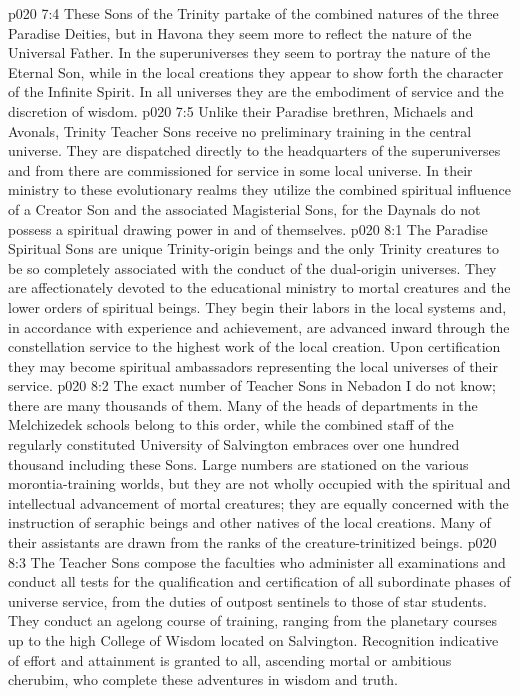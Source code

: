 \vs p020 7:4 These Sons of the Trinity partake of the combined natures of the three Paradise Deities, but in Havona they seem more to reflect the nature of the Universal Father. In the superuniverses they seem to portray the nature of the Eternal Son, while in the local creations they appear to show forth the character of the Infinite Spirit. In all universes they are the embodiment of service and the discretion of wisdom.
\vs p020 7:5 Unlike their Paradise brethren, Michaels and Avonals, Trinity Teacher Sons receive no preliminary training in the central universe. They are dispatched directly to the headquarters of the superuniverses and from there are commissioned for service in some local universe. In their ministry to these evolutionary realms they utilize the combined spiritual influence of a Creator Son and the associated Magisterial Sons, for the Daynals do not possess a spiritual drawing power in and of themselves.
\vs p020 8:1 The Paradise Spiritual Sons are unique Trinity\hyp{}origin beings and the only Trinity creatures to be so completely associated with the conduct of the dual\hyp{}origin universes. They are affectionately devoted to the educational ministry to mortal creatures and the lower orders of spiritual beings. They begin their labors in the local systems and, in accordance with experience and achievement, are advanced inward through the constellation service to the highest work of the local creation. Upon certification they may become spiritual ambassadors representing the local universes of their service.
\vs p020 8:2 The exact number of Teacher Sons in Nebadon I do not know; there are many thousands of them. Many of the heads of departments in the Melchizedek schools belong to this order, while the combined staff of the regularly constituted University of Salvington embraces over one hundred thousand including these Sons. Large numbers are stationed on the various morontia\hyp{}training worlds, but they are not wholly occupied with the spiritual and intellectual advancement of mortal creatures; they are equally concerned with the instruction of seraphic beings and other natives of the local creations. Many of their assistants are drawn from the ranks of the creature\hyp{}trinitized beings.
\vs p020 8:3 The Teacher Sons compose the faculties who administer all examinations and conduct all tests for the qualification and certification of all subordinate phases of universe service, from the duties of outpost sentinels to those of star students. They conduct an agelong course of training, ranging from the planetary courses up to the high College of Wisdom located on Salvington. Recognition indicative of effort and attainment is granted to all, ascending mortal or ambitious cherubim, who complete these adventures in wisdom and truth.
